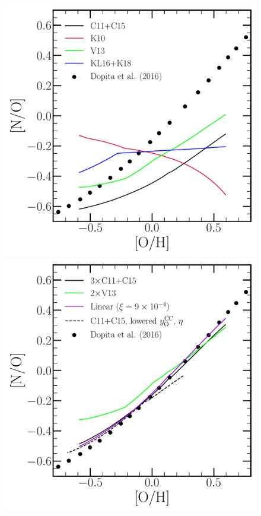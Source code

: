 \documentclass[ms.tex]{subfiles}
\begin{document}
\begin{figure}
\centering
\includegraphics[scale = 0.32]{no_oh_predictions_unmodified.pdf}
\includegraphics[scale = 0.32]{no_oh_predictions.pdf}

\end{figure}
\end{document}
